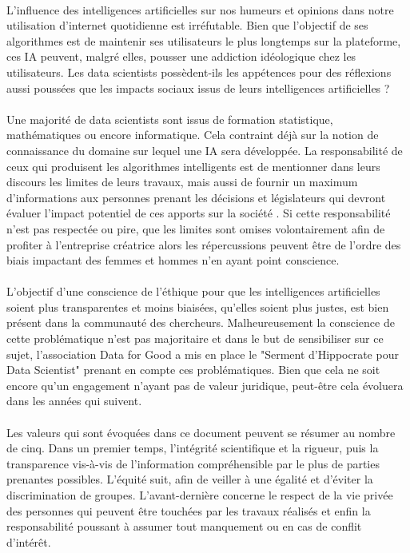 \documentclass[10pt, french, a4paper]{article}
\begin{document}
\paragraph{}
L’influence des intelligences artificielles sur nos humeurs et opinions dans notre utilisation d’internet quotidienne est irréfutable. Bien que l’objectif de ses algorithmes est de maintenir ses utilisateurs le plus longtemps sur la plateforme, ces IA peuvent, malgré elles, pousser une addiction idéologique chez les utilisateurs. Les data scientists possèdent-ils les appétences pour des réflexions aussi poussées que les impacts sociaux issus de leurs intelligences artificielles ?

\paragraph{}
Une majorité de data scientists sont issus de formation statistique, mathématiques ou encore informatique. Cela contraint déjà sur la notion de connaissance du domaine sur lequel une IA sera développée. La responsabilité de ceux qui produisent les algorithmes intelligents est de mentionner dans leurs discours les limites de leurs travaux, mais aussi de fournir un maximum d’informations aux personnes prenant les décisions et législateurs qui devront évaluer l’impact potentiel de ces apports sur la société \citep{cointe_ethical_2017}. Si cette responsabilité n’est pas respectée ou pire, que les limites sont omises volontairement afin de profiter à l’entreprise créatrice alors les répercussions peuvent être de l’ordre des biais impactant des femmes et hommes n’en ayant point conscience.

\paragraph{}
L’objectif d’une conscience de l’éthique pour que les intelligences artificielles soient plus transparentes et moins biaisées, qu’elles soient plus justes, est bien présent dans la communauté des chercheurs. Malheureusement la conscience de cette problématique n’est pas majoritaire et dans le but de sensibiliser sur ce sujet, l’association Data for Good a mis en place le "Serment d’Hippocrate pour Data Scientist" \citep{data_for_good_serment_2018} prenant en compte ces problématiques. Bien que cela ne soit encore qu’un engagement n’ayant pas de valeur juridique, peut-être cela évoluera dans les années qui suivent.

\paragraph{}
Les valeurs qui sont évoquées dans ce document peuvent se résumer au nombre de cinq. Dans un premier temps, l’intégrité scientifique et la rigueur, puis la transparence vis-à-vis de l’information compréhensible par le plus de parties prenantes possibles. L’équité suit, afin de veiller à une égalité et d’éviter la discrimination de groupes. L’avant-dernière concerne le respect de la vie privée des personnes qui peuvent être touchées par les travaux réalisés et enfin la responsabilité poussant à assumer tout manquement ou en cas de conflit d’intérêt.
\end{document}
